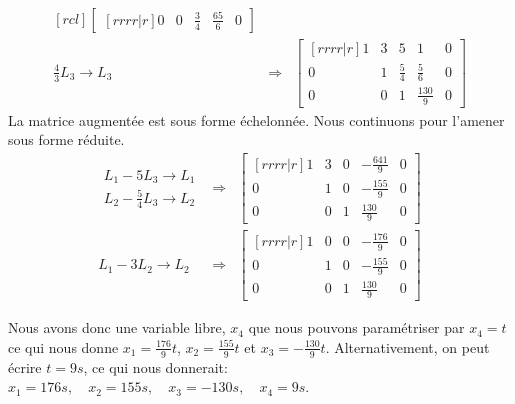 \begin{exemple}
\[\begin{matrix}[rcl]
\begin{bmatrix}[rrrr|r]
		0 & 0 & \frac{3}{4} & \frac{65}{6} & 0
		\end{bmatrix}
	\\[20pt]
		\frac{4}{3}L_3 \rightarrow L_3
		&\Longrightarrow&
		\begin{bmatrix}[rrrr|r]
		1 & 3 & 5 & 1 & 0 \\[5pt]
		0 & 1&\frac{5}{4}&\frac{5}{6}& 0 \\[5pt]
		0 & 0 & 1 & \frac{130}{9} & 0
		\end{bmatrix}
	\end{matrix}
	\]
	La matrice augmentée est sous forme échelonnée.  Nous continuons pour l'amener sous forme réduite.
	\[
	\begin{matrix}
		\begin{matrix}
		L_1 - 5L_3 \rightarrow L_1 \\[5pt]
		L_2 - \frac{5}{4}L_3 \rightarrow L_2
		\end{matrix}
		&\Longrightarrow&
		\begin{bmatrix}[rrrr|r]
		1 & 3 & 0 & -\frac{641}{9} & 0 \\[5pt]
		0 & 1&0&-\frac{155}{9}& 0 \\[5pt]
		0 & 0 & 1 & \frac{130}{9} & 0
		\end{bmatrix}
	\\[20pt]
		L_1 - 3L_2 \rightarrow L_2
		&\Longrightarrow&
		\begin{bmatrix}[rrrr|r]
		1 & 0 & 0 & -\frac{176}{9} & 0 \\[5pt]
		0 & 1&0&-\frac{155}{9}& 0 \\[5pt]
		0 & 0 & 1 & \frac{130}{9} & 0
		\end{bmatrix}
	\end{matrix}
	\]

	Nous avons donc une variable libre, $x_4$ que nous pouvons paramétriser par $x_4=t$ ce qui nous
	donne $x_1 = \frac{176}{9}t$, $x_2 = \frac{155}{9}t$ et $x_3 = -\frac{130}{9}t$.  Alternativement, on
	peut écrire $t = 9 s$, ce qui nous donnerait:
	$x_1= 176s, \quad x_2=155s, \quad x_3=-130s, \quad x_4 = 9s$.
\end{exemple}

